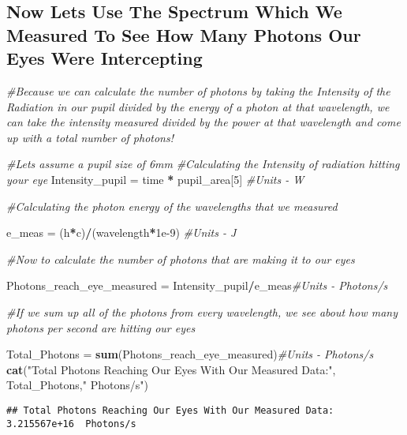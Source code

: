 \documentclass[]{article}
\newenvironment{Shaded}{\begin{snugshade}}{\end{snugshade}}
\newcommand{\KeywordTok}[1]{\textcolor[rgb]{0.13,0.29,0.53}{\textbf{#1}}}
\newcommand{\DecValTok}[1]{\textcolor[rgb]{0.00,0.00,0.81}{#1}}
\newcommand{\FloatTok}[1]{\textcolor[rgb]{0.00,0.00,0.81}{#1}}
\newcommand{\StringTok}[1]{\textcolor[rgb]{0.31,0.60,0.02}{#1}}
\newcommand{\CommentTok}[1]{\textcolor[rgb]{0.56,0.35,0.01}{\textit{#1}}}
\newcommand{\OperatorTok}[1]{\textcolor[rgb]{0.81,0.36,0.00}{\textbf{#1}}}
\newcommand{\NormalTok}[1]{#1}
\begin{document}
\subsection{Now Lets Use The Spectrum Which We Measured To See How Many
Photons Our Eyes Were
Intercepting}\label{now-lets-use-the-spectrum-which-we-measured-to-see-how-many-photons-our-eyes-were-intercepting}

\begin{Shaded}
\begin{Highlighting}[]
\CommentTok{#Because we can calculate the number of photons by taking the Intensity of the Radiation in our pupil divided by the energy of a photon at that wavelength, we can take the intensity measured divided by the power at that wavelength and come up with a total number of photons!}

\CommentTok{#Lets assume a pupil size of 6mm}
\CommentTok{#Calculating the Intensity of radiation hitting your eye}
\NormalTok{Intensity_pupil =}\StringTok{ }\NormalTok{time }\OperatorTok{*}\StringTok{ }\NormalTok{pupil_area[}\DecValTok{5}\NormalTok{] }\CommentTok{#Units - W}

\CommentTok{#Calculating the photon energy of the wavelengths that we measured}

\NormalTok{e_meas =}\StringTok{ }\NormalTok{(h}\OperatorTok{*}\NormalTok{c)}\OperatorTok{/}\NormalTok{(wavelength}\OperatorTok{*}\FloatTok{1e-9}\NormalTok{) }\CommentTok{#Units - J}

\CommentTok{#Now to calculate the number of photons that are making it to our eyes}

\NormalTok{Photons_reach_eye_measured =}\StringTok{ }\NormalTok{Intensity_pupil}\OperatorTok{/}\NormalTok{e_meas}\CommentTok{#Units - Photons/s}

\CommentTok{#If we sum up all of the photons from every wavelength, we see about how many photons per second are hitting our eyes}

\NormalTok{Total_Photons =}\StringTok{ }\KeywordTok{sum}\NormalTok{(Photons_reach_eye_measured)}\CommentTok{#Units - Photons/s}
\KeywordTok{cat}\NormalTok{(}\StringTok{"Total Photons Reaching Our Eyes With Our Measured Data:"}\NormalTok{, Total_Photons,}\StringTok{" Photons/s"}\NormalTok{)}
\end{Highlighting}
\end{Shaded}

\begin{verbatim}
## Total Photons Reaching Our Eyes With Our Measured Data: 3.215567e+16  Photons/s
\end{verbatim}
\end{document}
